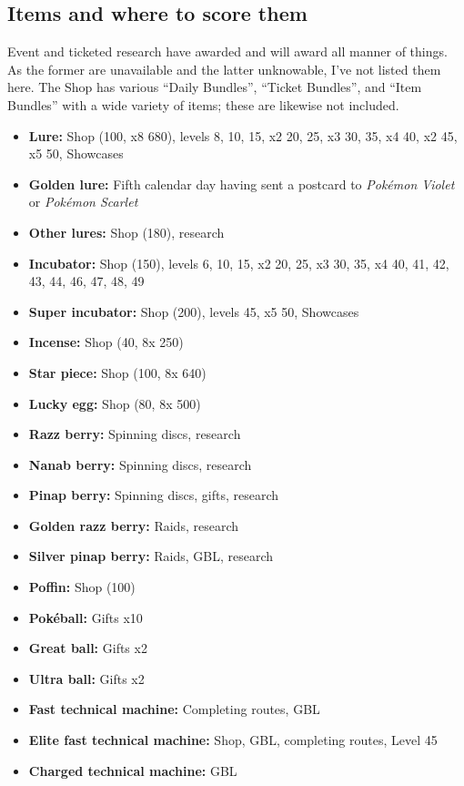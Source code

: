 \subsection{Items and where to score them\label{subsec:items}}
Event and ticketed research have awarded and will award all manner of things.
As the former are unavailable and the latter unknowable, I've not listed them here.
The Shop has various ``Daily Bundles'', ``Ticket Bundles'', and ``Item Bundles'' with
 a wide variety of items; these are likewise not included.
\begin{itemize}[noitemsep]
\item \textbf{Lure:} Shop (100\coin, x8 680\coin), levels 8, 10, 15, x2 20, 25, x3 30, 35, x4 40, x2 45, x5 50, Showcases
\item \textbf{Golden lure:} Fifth calendar day having sent a postcard to \textit{Pokémon Violet} or \textit{Pokémon Scarlet}
\item \textbf{Other lures:} Shop (180\coin), research
\item \textbf{Incubator:} Shop (150\coin), levels 6, 10, 15, x2 20, 25, x3 30, 35, x4 40, 41, 42, 43, 44, 46, 47, 48, 49
\item \textbf{Super incubator:} Shop (200\coin), levels 45, x5 50, Showcases
\item \textbf{Incense:} Shop (40\coin, 8x 250\coin)
\item \textbf{Star piece:} Shop (100\coin, 8x 640\coin)
\item \textbf{Lucky egg:} Shop (80\coin, 8x 500\coin)
\item \textbf{Razz berry:} Spinning discs, research
\item \textbf{Nanab berry:} Spinning discs, research
\item \textbf{Pinap berry:} Spinning discs, gifts, research
\item \textbf{Golden razz berry:} Raids, research
\item \textbf{Silver pinap berry:} Raids, GBL, research
\item \textbf{Poffin:} Shop (100\coin)
\item \textbf{Pokéball:} Gifts x10
\item \textbf{Great ball:} Gifts x2
\item \textbf{Ultra ball:} Gifts x2
\item \textbf{Fast technical machine:} Completing routes, GBL
\item \textbf{Elite fast technical machine:} Shop, GBL, completing routes, Level 45
\item \textbf{Charged technical machine:} GBL

\end{itemize}
